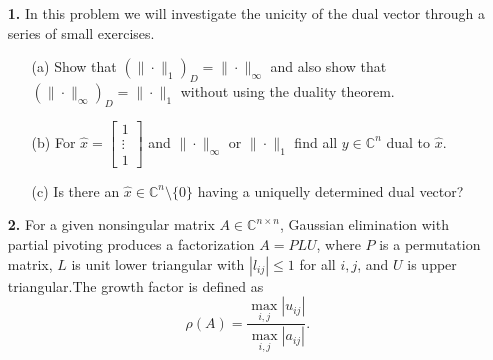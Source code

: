 \documentclass[10pt]{report}
\begin{document}
\begin{enumerate}
    
\item[\textbf{1.}] In this problem we will investigate the unicity of the dual vector through a series of small exercises.
  \begin{enumerate}
    \item[(a)] Show that $(\|\cdot\|_1)_D=\|\cdot\|_{\infty}$ and also show that
      $(\|\cdot\|_{\infty})_D=\|\cdot\|_{1}$ without using the duality theorem.

  \item[(b)] For $\hat{x}=\left[\begin{array}{c}1\\\vdots\\1\end{array}\right]$ and $\|\cdot\|_{\infty}$ or $\|\cdot\|_{1}$ find all $y\in\mathbb{C}^{n}$ dual to $\hat{x}$. 

    \item[(c)] Is there an $\hat{x}\in\mathbb{C}^{n}\setminus\{0\}$ having a uniquelly determined dual vector?
  \end{enumerate}

\vspace{0.1cm} 

\item[\textbf{2.}] For a given nonsingular matrix $A\in\mathbb{C}^{n\times n}$, Gaussian elimination with partial pivoting produces a factorization $A=PLU$, where $P$ is a permutation matrix, $L$ is unit lower triangular with $|l_{ij}|\leq1$ for all $i,j$, and $U$ is upper triangular.The growth factor is defined as\[\rho(A)=\frac{\max_{i,j}|u_{ij}|}{\max_{i,j}|a_{ij}|}.\]


\end{enumerate}
\end{document}
